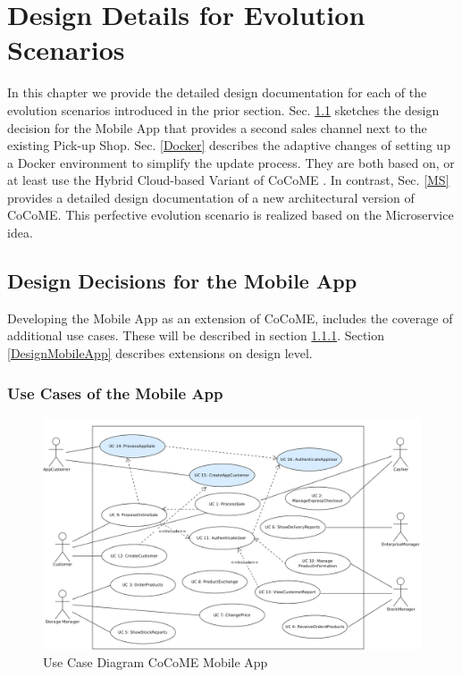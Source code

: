 \chapter{Design Details for Evolution Scenarios}
In this chapter we provide the detailed design documentation for each of the evolution scenarios
introduced in the prior section. Sec. \ref{App} sketches the design decision for the Mobile App that provides a second sales channel next to the existing Pick-up Shop. Sec. \ref{Docker} describes the adaptive changes of setting up a Docker environment to simplify the update process. They are both based on, or at least use the Hybrid Cloud-based Variant of CoCoME \cite{SWB-469002735}. In contrast, Sec. \ref{MS} provides a detailed design documentation of a new architectural version of CoCoME. This perfective evolution scenario is realized based on the Microservice idea.

\section{Design Decisions for the Mobile App} \label{App} %
Developing the Mobile App as an extension of CoCoME, includes the coverage of additional use cases. These will be described in section \ref{UseCasesMobileApp}. Section \ref{DesignMobileApp} describes extensions on design level.
\subsection{Use Cases of the Mobile App}\label{UseCasesMobileApp}
		\begin{figure}[t]
			\includegraphics[width=\textwidth]{img/UseCaseApp.png}
			\caption{Use Case Diagram CoCoME Mobile App}
		\end{figure}

